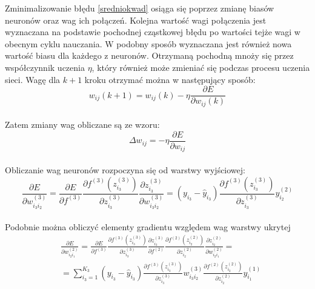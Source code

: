 \documentclass[12pt,twoside]{article}
\begin{document}
Zminimalizowanie błędu \ref{sredniokwad} osiąga się poprzez zmianę biasów neuronów oraz wag ich połączeń. Kolejna wartość wagi połączenia jest wyznaczana na podstawie pochodnej cząstkowej błędu po wartości tejże wagi w obecnym cyklu nauczania. W podobny sposób wyznaczana jest również nowa wartość biasu dla każdego z neuronów. Otrzymaną pochodną mnoży się przez współczynnik uczenia $\eta$, który również może zmieniać się podczas procesu uczenia sieci. Wagę dla $k+1$ kroku otrzymać można w następujący sposób:\\
\begin{equation}
w_{ij}(k+1) = w_{ij}(k) - \eta \frac{\partial E}{\partial w_{ij}(k)}
\end{equation}\\

Zatem zmiany wag obliczane są ze wzoru:\\
\begin{equation}
\Delta w_{ij} = - \eta \frac{\partial E}{\partial w_{ij}}
\end{equation}\\

Obliczanie wag neuronów rozpoczyna się od warstwy wyjściowej:\\
\begin{equation}
\frac{\partial E}{\partial w_{i_{3}i_{2}}^{(3)}} = \frac{\partial E}{\partial f^{(3)}} \frac{\partial f^{(3)}\left( z_{i_{3}}^{(3)} \right)}{\partial z_{i_{3}}^{(3)}} \frac{\partial z_{i_{3}}^{(3)}}{\partial w_{i_{3}i_{2}}^{(3)}} = \left( y_{i_{3}} - \hat{y}_{i_{3}} \right) \frac{\partial f^{(3)}\left( z_{i_{3}}^{(3)} \right)}{\partial z_{i_{3}}^{(3)}} y_{i_{2}}^{(2)}
\end{equation}\\
\newpage
Podobnie można obliczyć elementy gradientu względem wag warstwy ukrytej\\
\begin{equation}
\begin{aligned}
&\frac{\partial E}{\partial w_{i_{2}i_{1}}^{(2)}} = \frac{\partial E}{\partial f^{(3)}} \frac{\partial f^{(3)}\left( z_{i_{3}}^{(3)} \right)}{\partial z_{i_{3}}^{(3)}} \frac{\partial z_{i_{3}}^{(3)}}{\partial f^{(2)}} \frac{\partial f^{(2)}\left( z_{i_{2}}^{(2)} \right)}{\partial z_{i_{2}}^{(2)}} \frac{\partial z_{i_{2}}^{(2)}}{\partial w_{i_{2}i_{1}}^{(2)}}  =\\
&= \sum_{i_{3}=1}^{K_3}\left( y_{i_{3}} - \hat{y}_{i_{3}} \right) \frac{\partial f^{(3)}\left( z_{i_{3}}^{(3)} \right)}{\partial z_{i_{3}}^{(3)}} w_{i_{3}i_{2}}^{(3)} \frac{\partial f^{(2)}\left( z_{i_{2}}^{(2)} \right)}{\partial z_{i_{2}}^{(2)}} y_{i_{1}}^{(1)}
\end{aligned}
\end{equation}\\
\end{document}
